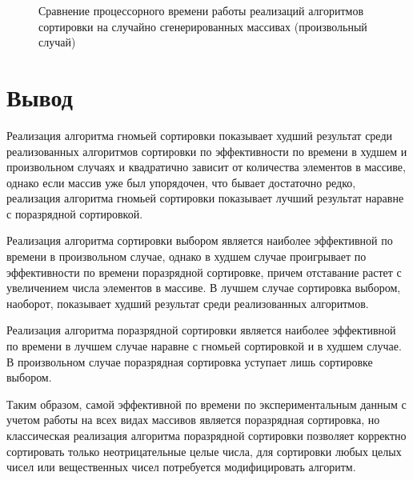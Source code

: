 \begin{figure}[h!]
	
	
	\caption{Сравнение процессорного времени работы реализаций алгоритмов сортировки на случайно сгенерированных массивах (произвольный случай)}
	
	\label{fig:fig3}
	
\end{figure}

\FloatBarrier

\section*{Вывод}
Реализация алгоритма гномьей сортировки показывает худший результат среди реализованных алгоритмов сортировки по эффективности по времени в худшем и произвольном случаях и квадратично зависит от количества элементов в массиве, однако если массив уже был упорядочен, что бывает достаточно редко, реализация алгоритма гномьей сортировки показывает лучший результат наравне с поразрядной сортировкой.

Реализация алгоритма сортировки выбором является наиболее эффективной по времени в произвольном случае, однако в худшем случае проигрывает по эффективности по времени поразрядной сортировке, причем отставание растет с увеличением числа элементов в массиве. В лучшем случае сортировка выбором, наоборот, показывает худший результат среди реализованных алгоритмов.

Реализация алгоритма поразрядной сортировки является наиболее эффективной по времени в лучшем случае наравне с гномьей сортировкой и в худшем случае. В произвольном случае поразрядная сортировка уступает лишь сортировке выбором.

Таким образом, самой эффективной по времени по экспериментальным данным с учетом работы на всех видах массивов является поразрядная сортировка, но классическая реализация алгоритма поразрядной сортировки позволяет корректно сортировать только неотрицательные целые числа, для сортировки любых целых чисел или вещественных чисел потребуется модифицировать алгоритм.
